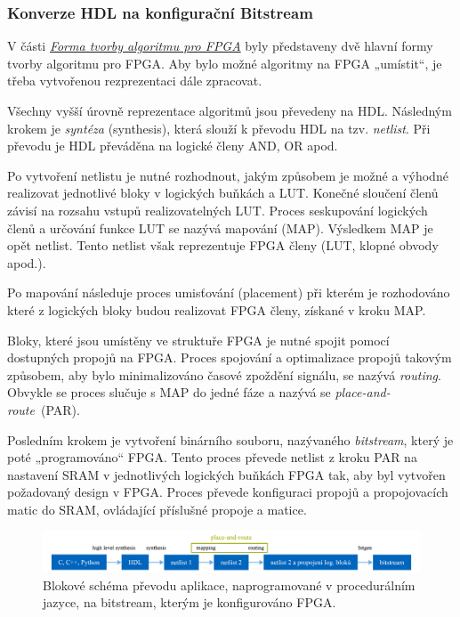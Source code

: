 \documentclass[a4paper, twoside, 11pt]{article}
\begin{document}
		\subsubsection{Konverze HDL na konfigurační Bitstream}
			V části \hyperref[subsubsec:forma-tvorby-algoritmu-pro-fpga]{\textit{Forma tvorby algoritmu pro FPGA}} byly představeny dvě hlavní formy tvorby algoritmu pro FPGA. Aby bylo možné algoritmy na FPGA „umístit“, je třeba vytvořenou rezprezentaci dále zpracovat.\par
			Všechny vyšší úrovně reprezentace algoritmů jsou převedeny na HDL. Následným krokem je \textit{syntéza} (synthesis), která slouží k převodu HDL na tzv. \textit{netlist}. Při převodu je HDL převáděna na logické členy AND, OR apod. \cite{Sass2010}\par
			Po vytvoření netlistu je nutné rozhodnout, jakým způsobem je možné a výhodné realizovat jednotlivé bloky v logických buňkách a LUT. Konečné sloučení členů závisí na rozsahu vstupů realizovatelných LUT. Proces seskupování logických členů a určování funkce LUT se nazývá mapování (MAP). Výsledkem MAP je opět netlist. Tento netlist však reprezentuje FPGA členy (LUT, klopné obvody apod.). \cite{Sass2010}\par
			Po mapování následuje proces umisťování (placement) při kterém je rozhodováno které z logických bloky budou realizovat FPGA členy, získané v kroku MAP. \cite{Sass2010}\par
			Bloky, které jsou umístěny ve struktuře FPGA je nutné spojit pomocí dostupných propojů na FPGA. Proces spojování a optimalizace propojů takovým způsobem, aby bylo minimalizováno časové zpoždění signálu, se nazývá \textit{routing}. Obvykle se proces slučuje s MAP do jedné fáze a nazývá se \textit{place-and-route}~(PAR). \cite{Sass2010} \par
			Posledním krokem je vytvoření binárního souboru, nazývaného \textit{bitstream}, který je poté „programováno“ FPGA. Tento proces převede netlist z kroku PAR na nastavení SRAM v jednotlivých logických buňkách FPGA tak, aby byl vytvořen požadovaný design v FPGA. Proces převede konfiguraci propojů a propojovacích matic do SRAM, ovládající příslušné propoje a matice. \cite{Sass2010}\par

			
			\begin{figure}[htbp!]
				\centering
					\includegraphics[width=1\textwidth]{src/pdf/fpga-hls-to-bitstream-flow-chart.pdf} 
					\caption{Blokové schéma převodu aplikace, naprogramované v procedurálním jazyce, na bitstream, kterým je konfigurováno FPGA.}
					\label{fig:fpga-hls-to-bitstream-flow-chart}
			\end{figure}
\end{document}
